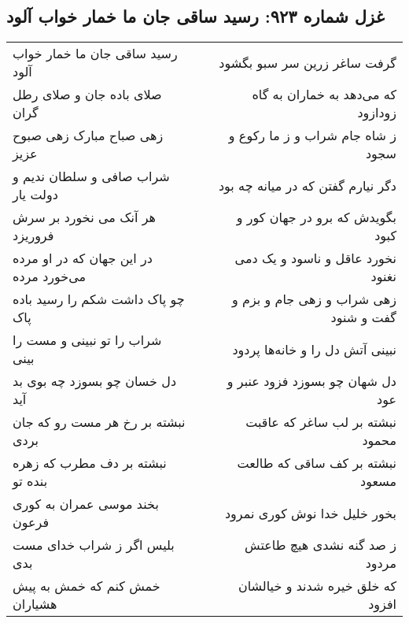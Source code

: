 \begin{center}
\section*{غزل شماره ۹۲۳: رسید ساقی جان ما خمار خواب آلود}
\label{sec:0923}
\begin{longtable}{l p{0.5cm} r}
رسید ساقی جان ما خمار خواب آلود
&&
گرفت ساغر زرین سر سبو بگشود
\\
صلای باده جان و صلای رطل گران
&&
که می‌دهد به خماران به گاه زودازود
\\
زهی صباح مبارک زهی صبوح عزیز
&&
ز شاه جام شراب و ز ما رکوع و سجود
\\
شراب صافی و سلطان ندیم و دولت یار
&&
دگر نیارم گفتن که در میانه چه بود
\\
هر آنک می نخورد بر سرش فروریزد
&&
بگویدش که برو در جهان کور و کبود
\\
در این جهان که در او مرده می‌خورد مرده
&&
نخورد عاقل و ناسود و یک دمی نغنود
\\
چو پاک داشت شکم را رسید باده پاک
&&
زهی شراب و زهی جام و بزم و گفت و شنود
\\
شراب را تو نبینی و مست را بینی
&&
نبینی آتش دل را و خانه‌ها پردود
\\
دل خسان چو بسوزد چه بوی بد آید
&&
دل شهان چو بسوزد فزود عنبر و عود
\\
نبشته بر رخ هر مست رو که جان بردی
&&
نبشته بر لب ساغر که عاقبت محمود
\\
نبشته بر دف مطرب که زهره بنده تو
&&
نبشته بر کف ساقی که طالعت مسعود
\\
بخند موسی عمران به کوری فرعون
&&
بخور خلیل خدا نوش کوری نمرود
\\
بلیس اگر ز شراب خدای مست بدی
&&
ز صد گنه نشدی هیچ طاعتش مردود
\\
خمش کنم که خمش به پیش هشیاران
&&
که خلق خیره شدند و خیالشان افزود
\\
\end{longtable}
\end{center}
